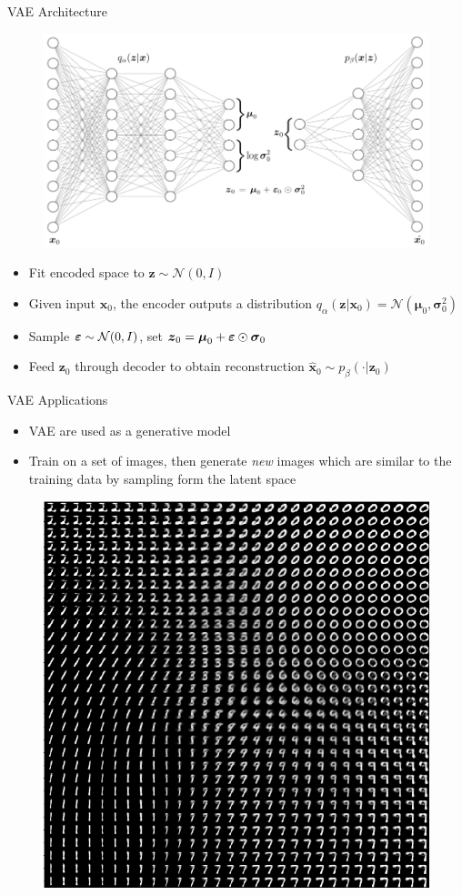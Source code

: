 \documentclass{beamer}
\def \e{\ensuremath \varepsilon}
\newcommand{\vect}[1]{\boldsymbol{#1}}
\theoremstyle{definition}
\begin{document}
\begin{frame}{VAE Architecture}
\begin{figure}
  \includegraphics[width=.75\textwidth]{../img/vae_visual.png}
\end{figure}
\scriptsize
\begin{itemize}
  \item<1-> Fit encoded space to $\vect z \sim \mathcal{N}(0,I)$
  \item<1-> Given input $\vect x_0$, the encoder outputs a distribution $q_\alpha(\vect z | \vect x_0) = \mathcal{N}(\vect \mu_0, \vect \sigma_0^2)$
  \item<2-> Sample $\vect \e \sim \mathcal{N}(0,I)$, set $\vect z_0 = \vect \mu_0 + \vect \e \odot \vect \sigma_0$
  \item<2-> Feed $\vect z_0$ through decoder to obtain reconstruction $\hat{\vect x}_0 \sim p_\beta(\cdot | \vect z_0)$
\end{itemize}
\end{frame}
\begin{frame}{VAE Applications}
  \scriptsize
  \begin{itemize}
    \item VAE are used as a generative model
    \item Train on a set of images, then generate \textit{new} images which are similar to the training data by sampling form the latent space
  \end{itemize}
  \begin{figure}[h]
    \centering
    \includegraphics[width=.55\textwidth]{../img/vae_mnist_latent_gen.png}
  \end{figure}
\end{frame}
\end{document}

